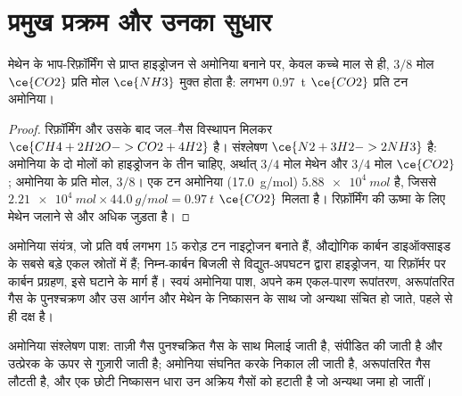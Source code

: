 \section{प्रमुख प्रक्रम और उनका सुधार}

\begin{proposition}[अमोनिया से कार्बन डाइऑक्साइड]\label{prop:b3:green-industrial:smr}
मेथेन के भाप-रिफ़ॉर्मिंग से प्राप्त हाइड्रोजन से अमोनिया बनाने पर, केवल
कच्चे माल से ही, $3/8$ मोल $\ce{CO2}$ प्रति मोल $\ce{NH3}$ मुक्त होता है: लगभग \qty{0.97}{t} $\ce{CO2}$ प्रति टन अमोनिया।
\end{proposition}

\begin{proof}
रिफ़ॉर्मिंग और उसके बाद जल--गैस विस्थापन मिलकर $\ce{CH4 + 2H2O -> CO2 + 4H2}$ है। संश्लेषण
$\ce{N2 + 3H2 -> 2NH3}$ है: अमोनिया के दो मोलों को हाइड्रोजन के तीन चाहिए, अर्थात् $3/4$ मोल
मेथेन और $3/4$ मोल $\ce{CO2}$; अमोनिया के प्रति मोल, $3/8$। एक टन अमोनिया
(\qty{17.0}{g/mol}) $\qty{5.88e4}{mol}$ है, जिससे $\qty{2.21e4}{mol} \times \qty{44.0}{g/mol} = \qty{0.97}{t}$ $\ce{CO2}$ मिलता है। रिफ़ॉर्मिंग की ऊष्मा के लिए
मेथेन जलाने से और अधिक जुड़ता है।
\end{proof}

अमोनिया संयंत्र, जो प्रति वर्ष लगभग 15 करोड़ टन नाइट्रोजन बनाते हैं, औद्योगिक
कार्बन डाइऑक्साइड के सबसे बड़े एकल स्रोतों में हैं; निम्न-कार्बन बिजली से
विद्युत-अपघटन द्वारा हाइड्रोजन, या रिफ़ॉर्मर पर कार्बन प्रग्रहण,
इसे घटाने के मार्ग हैं। स्वयं अमोनिया पाश, अपने कम एकल-पारण
रूपांतरण, अरूपांतरित गैस के पुनश्चक्रण और उस आर्गन और मेथेन के निष्कासन के साथ जो
अन्यथा संचित हो जाते, पहले से ही दक्ष है।

\begin{omfigure}

{\small अमोनिया संश्लेषण पाश: ताज़ी गैस पुनश्चक्रित गैस के साथ मिलाई जाती है,
संपीडित की जाती है और उत्प्रेरक के ऊपर से गुज़ारी जाती है; अमोनिया संघनित करके निकाल ली जाती है, अरूपांतरित
गैस लौटती है, और एक छोटी निष्कासन धारा उन अक्रिय गैसों को हटाती है जो
अन्यथा जमा हो जातीं।}
\end{omfigure}

